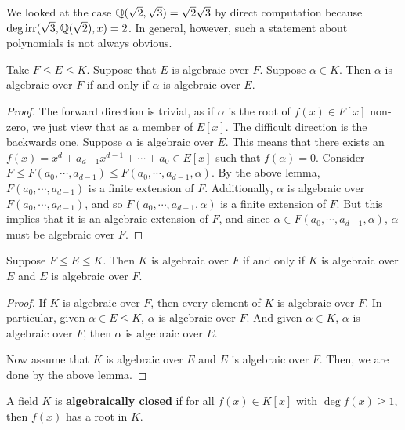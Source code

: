 \documentclass{../mathnotes}
\begin{document}
\begin{exmp}
    We looked at the case $\mathbb{Q}(\sqrt{2},\sqrt{3})=\sqrt{2}\sqrt{3}$ by direct computation because $\deg\operatorname{irr}(\sqrt{3},\mathbb{Q}(\sqrt{2}),x)=2$.
    In general, however, such a statement about polynomials is not always obvious.
\end{exmp}

\begin{lem}
    Take $F\leq E\leq K$. Suppose that $E$ is algebraic over $F$. Suppose $\alpha\in K$. Then $\alpha$ is algebraic over $F$
    if and only if $\alpha$ is algebraic over $E$.
\end{lem}
\begin{proof}
    The forward direction is trivial, as if $\alpha$ is the root of $f(x)\in F[x]$ non-zero, we just view that as a member
    of $E[x]$. The difficult direction is the backwards one. Suppose $\alpha$ is algebraic over $E$. This means that there exists an
    $f(x)=x^d+a_{d-1}x^{d-1}+\cdots+a_0\in E[x]$ such that $f(\alpha)=0$. Consider $F\leq F(a_0,\cdots,a_{d-1})\leq F(a_0,\cdots,a_{d-1},\alpha)$.
    By the above lemma, $F(a_0,\cdots,a_{d-1})$ is a finite extension of $F$. Additionally, $\alpha$ is algebraic over $F(a_0,\cdots,a_{d-1})$,
    and so $F(a_0,\cdots,a_{d-1},\alpha)$ is a finite extension of $F$. But this implies that it is an algebraic extension of $F$, and since
    $\alpha\in F(a_0,\cdots,a_{d-1},\alpha)$, $\alpha$ must be algebraic over $F$.
\end{proof}

\begin{cor}
    Suppose $F\leq E\leq K$. Then $K$ is algebraic over $F$ if and only if $K$ is algebraic over $E$ and $E$ is algebraic over $F$.
\end{cor}
\begin{proof}
    If $K$ is algebraic over $F$, then every element of $K$ is algebraic over $F$. In particular,
    given $\alpha\in E\leq K$, $\alpha$ is algebraic over $F$. And given $\alpha\in K$, $\alpha$ is algebraic over $F$, then $\alpha$ is algebraic
    over $E$.

    Now assume that $K$ is algebraic over $E$ and $E$ is algebraic over $F$. Then, we are done by the above lemma.
\end{proof}

\begin{defn}
    A field $K$ is \textbf{algebraically closed} if for all $f(x)\in K[x]$ with $\deg f(x)\geq 1$, then $f(x)$ has a root in $K$.
\end{defn}
\end{document}
